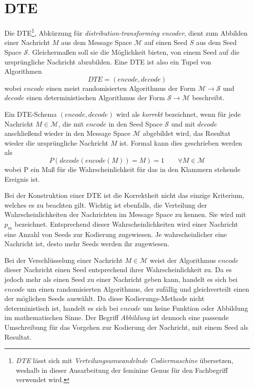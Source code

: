 \section{DTE}
\label{sec:dte}
Die DTE\footnote{\emph{DTE} lässt sich mit \emph{Verteilungsumwandelnde Codiermaschine} übersetzen, weshalb in dieser Ausarbeitung der feminine Genus für den Fachbegriff verwendet wird.}, Abkürzung für \emph{distribution-transforming encoder}, dient zum Abbilden einer Nachricht $M$ aus dem Message Space $\mathcal{M}$ auf einen Seed $S$ aus dem Seed Space $\mathcal{S}$. Gleichermaßen soll sie die Möglichkeit bieten, von einem Seed auf die ursprüngliche Nachricht abzubilden. Eine DTE ist also ein Tupel von Algorithmen
$$DTE = (encode, decode)$$
wobei $encode$ einen meist randomisierten Algorithmus der Form $\mathcal{M} \rightarrow \mathcal{S}$ und $decode$ einen deterministischen Algorithmus der Form $\mathcal{S} \rightarrow \mathcal{M}$ beschreibt.

Ein DTE-Schema $(encode, decode)$ wird als \emph{korrekt} bezeichnet, wenn für jede Nachricht $M \in \mathcal{M}$, die mit $encode$ in den Seed Space $\mathcal{S}$ und mit $decode$ anschließend wieder in den Message Space $\mathcal{M}$ abgebildet wird, das Resultat wieder die ursprüngliche Nachricht $M$  ist. Formal kann dies geschrieben werden als
$$P(decode(encode(M)) = M) = 1 \qquad \forall M \in \mathcal{M}$$
wobei P ein Maß für die Wahrscheinlichkeit für das in den Klammern stehende Ereignis ist.

Bei der Konstruktion einer DTE ist die Korrektheit nicht das einzige Kriterium, welches es zu beachten gilt. Wichtig ist ebenfalls, die Verteilung der Wahrscheinlichkeiten der Nachrichten im Message Space zu kennen. Sie wird mit $p_m$ bezeichnet. Entsprechend dieser Wahrscheinlichkeiten wird einer Nachricht eine Anzahl von Seeds zur Kodierung zugewiesen. Je wahrscheinlicher eine Nachricht ist, desto mehr Seeds werden ihr zugewiesen.

Bei der Verschlüsselung einer Nachricht $M \in \mathcal{M}$ weist der Algorithmus $encode$ dieser Nachricht einen Seed entsprechend ihrer Wahrscheinlichkeit zu. Da es jedoch mehr als einen Seed zu einer Nachricht geben kann, handelt es sich bei $encode$ um einen randomisierten Algorithmus, der zufällig und gleichverteilt einen der möglichen Seeds auswählt. Da diese Kodierungs-Methode nicht deterministisch ist, handelt es sich bei $encode$ um keine Funktion oder Abbildung im mathematischen Sinne. Der Begriff \emph{Abbildung} ist dennoch eine passende Umschreibung für das Vorgehen zur Kodierung der Nachricht, mit einem Seed als Resultat.


